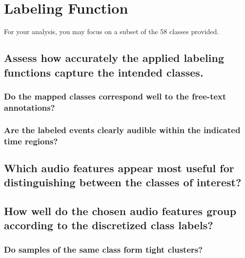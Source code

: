 
\section{Labeling Function}
\label{sec:Labeling Function}



For your analysis, you may focus on a subset of the 58 classes provided.



\subsection{Assess how accurately the applied labeling functions capture the intended classes. }
\label{sec:Labeling Function:a}



\subsubsection{Do the mapped classes correspond well to the free-text annotations? }
\label{sec:Labeling Function:a-1}



\subsubsection{Are the labeled events clearly audible within the indicated time regions? }
\label{sec:Labeling Function:a-2}






\subsection{Which audio features appear most useful for distinguishing between the classes of interest? }
\label{sec:Labeling Function:b}






\subsection{How well do the chosen audio features group according to the discretized class labels? }
\label{sec:Labeling Function:c}



\subsubsection{Do samples of the same class form tight clusters? }
\label{sec:Labeling Function:c-1}



